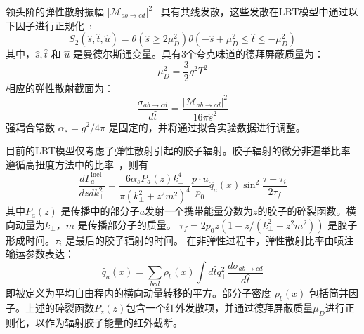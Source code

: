   领头阶的弹性散射振幅 $\left|\mathcal{M}_{a b \rightarrow c d}\right|^2$ ~\parencite{Eichten:1984eu}具有共线发散，这些发散在LBT模型中通过以下因子进行正规化~\parencite{Auvinen:2009qm}:
  \begin{equation}
  	S_2(\hat{s}, \hat{t}, \hat{u})=\theta\left(\hat{s} \geqslant 2 \mu_D^2\right) \theta\left(-\hat{s}+\mu_D^2 \leqslant \hat{t} \leqslant-\mu_D^2\right)
  \end{equation}
  其中，$\hat{s}, \hat{t}$ 和 $\hat{u}$ 是曼德尔斯通变量。具有3个夸克味道的德拜屏蔽质量为：
  \begin{equation}
  	\mu_D^2=\frac{3}{2} g^2 T^2
  \end{equation}
	相应的弹性散射截面为：
	\begin{equation}
		\frac{\sigma_{ab  \rightarrow cd}}{d \hat{t}} = \frac{\left|\mathcal{M}_{a b \rightarrow c d}\right|^2 }{16\pi \hat{s}^2}
	\end{equation}
		强耦合常数 $\alpha_s = g^2/4\pi$ 是固定的，并将通过拟合实验数据进行调整。
	
	目前的LBT模型仅考虑了弹性散射引起的胶子辐射。胶子辐射的微分非遍举比率遵循高扭度方法中的比率~\parencite{Guo:2000nz,Wang:2001ifa}，则有
  \begin{equation}
  	\frac{d \Gamma_a^{\text {inel }}}{d z d k_{\perp}^2}=\frac{6 \alpha_s P_a(z) k_{\perp}^4}{\pi\left(k_{\perp}^2+z^2 m^2\right)^4} \frac{p \cdot u}{p_0} \hat{q}_a(x) \sin ^2 \frac{\tau-\tau_i}{2 \tau_f}
  \end{equation}
  其中$P_a(z)$ 是传播中的部分子$a$发射一个携带能量分数为$z$的胶子的碎裂函数。横向动量为$k_\perp$，$m$ 是传播部分子的质量。
  $\tau_f = 2p_0z(1-z/(k_{\perp}^2+z^2m^2))$ 是胶子形成时间。$\tau_i$ 是最后的胶子辐射的时间。
  在非弹性过程中，弹性散射比率由喷注输运参数表达：
  \begin{equation}
  	\hat{q}_a(x)=\sum_{b c d} \rho_b(x) \int d \hat{t} q_{\perp}^2 \frac{d \sigma_{a b \rightarrow c d}}{d \hat{t}}
  \end{equation}
  即被定义为平均自由程内的横向动量转移的平方。部分子密度 $\rho_b(x)$ 包括简并因子。上述的碎裂函数$P_z(z)$包含一个红外发散项，并通过德拜屏蔽质量$\mu_D$进行正则化，以作为辐射胶子能量的红外截断。

